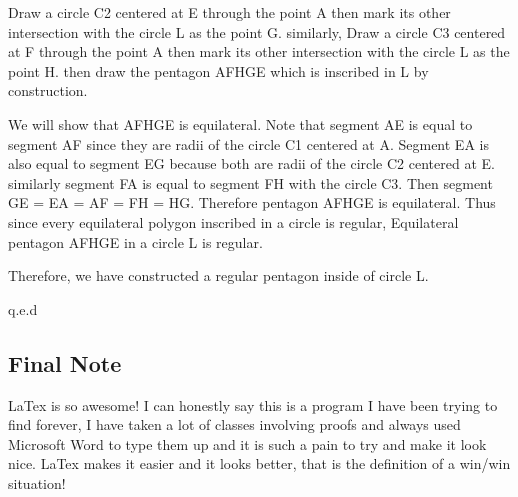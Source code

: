 \documentclass{article}
\begin{document}
Draw a circle C2 centered at E through the point A then mark its other intersection with the circle L as the point G. similarly, Draw a circle C3 centered at F through the point A then mark its other intersection with the circle L as the point H. then draw the pentagon AFHGE which is inscribed in L by construction.

We will show that AFHGE is equilateral. Note that segment AE is equal to segment AF since they are radii of the circle C1 centered at A. Segment EA is also equal to segment EG because both are radii of the circle C2 centered at E. similarly segment FA is equal to segment FH with the circle C3. Then segment GE = EA = AF = FH = HG. Therefore pentagon AFHGE is equilateral. Thus since every equilateral polygon inscribed in a circle is regular, Equilateral pentagon AFHGE in a circle L is regular.

Therefore, we have constructed a regular pentagon inside of circle L.

\hfill q.e.d

\subsection{Final Note}

LaTex is so awesome! I can honestly say this is a program I have been trying to find forever, I have taken a lot of classes involving proofs and always used Microsoft Word to type them up and it is such a pain to try and make it look nice. LaTex makes it easier and it looks better, that is the definition of a win/win situation!
\end{document}
